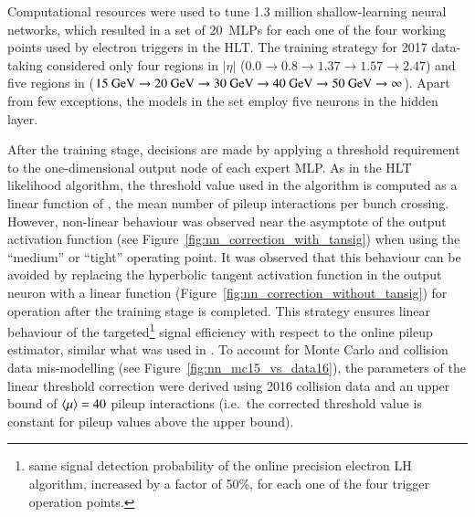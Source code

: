 Computational resources were used to tune 1.3 million shallow-learning neural networks, which resulted in a set of \SI{20}{MLPs} for each one of the four working points used by electron triggers in the HLT. 
The training strategy for 2017 data-taking considered only four regions in $|\eta|$ ($0.0\rightarrow 0.8\rightarrow1.37\rightarrow1.57\rightarrow2.47$) and five regions in \ET ($15~\text{GeV}\rightarrow 20~\text{GeV}\rightarrow 30~\text{GeV}\rightarrow 40~\text{GeV}\rightarrow 50~\text{GeV}\rightarrow\infty$).
Apart from few exceptions, the models in the set employ five neurons in the hidden layer. 

After the training stage, decisions are made by applying a threshold requirement to the one-dimensional output node of each expert MLP. 
As in the HLT likelihood \cite{aaboud2019electron} algorithm, the threshold value used in the \rnn algorithm is computed as a linear function of \avgmu{}, the mean number of pileup interactions per bunch crossing.
However, non-linear behaviour was observed near the asymptote of the output activation function (see Figure~\ref{fig:nn_correction_with_tansig}) when using the \enquote{medium} or \enquote{tight} operating point. It was 
observed that this behaviour can be avoided by replacing the hyperbolic tangent activation function in the output neuron with a linear function (Figure~\ref{fig:nn_correction_without_tansig}) for operation after the training stage is completed.
This strategy ensures linear behaviour of the targeted\footnote{same signal detection probability of the online precision electron LH algorithm, increased by a factor of 50\%, for each one of the four trigger operation points.} signal efficiency with respect to the online pileup estimator, similar what was used in \cite{aaboud2019electron}. 
To account for Monte Carlo and collision data mis-modelling (see Figure~\ref{fig:nn_mc15_vs_data16}), the parameters of the linear threshold correction were derived using 2016 collision data and an upper bound of $\langle \mu \rangle=40$ pileup interactions (i.e.\ the corrected threshold value is constant for pileup values above the upper bound).


